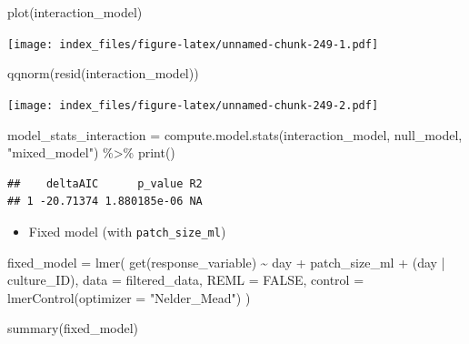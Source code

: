 \documentclass[
]{article}
\newenvironment{Shaded}{\begin{snugshade}}{\end{snugshade}}
\newcommand{\AttributeTok}[1]{\textcolor[rgb]{0.77,0.63,0.00}{#1}}
\newcommand{\ConstantTok}[1]{\textcolor[rgb]{0.00,0.00,0.00}{#1}}
\newcommand{\FunctionTok}[1]{\textcolor[rgb]{0.00,0.00,0.00}{#1}}
\newcommand{\NormalTok}[1]{#1}
\newcommand{\OtherTok}[1]{\textcolor[rgb]{0.56,0.35,0.01}{#1}}
\newcommand{\SpecialCharTok}[1]{\textcolor[rgb]{0.00,0.00,0.00}{#1}}
\newcommand{\StringTok}[1]{\textcolor[rgb]{0.31,0.60,0.02}{#1}}
\providecommand{\tightlist}{%
  \setlength{\itemsep}{0pt}\setlength{\parskip}{0pt}}
\begin{document}
\begin{Shaded}
\begin{Highlighting}[]
\FunctionTok{plot}\NormalTok{(interaction\_model)}
\end{Highlighting}
\end{Shaded}

\texttt{[image: index\_files/figure-latex/unnamed-chunk-249-1.pdf]}

\begin{Shaded}
\begin{Highlighting}[]
\FunctionTok{qqnorm}\NormalTok{(}\FunctionTok{resid}\NormalTok{(interaction\_model))}
\end{Highlighting}
\end{Shaded}

\texttt{[image: index\_files/figure-latex/unnamed-chunk-249-2.pdf]}

\begin{Shaded}
\begin{Highlighting}[]
\NormalTok{model\_stats\_interaction }\OtherTok{=} \FunctionTok{compute.model.stats}\NormalTok{(interaction\_model,}
\NormalTok{                                              null\_model,}
                                              \StringTok{"mixed\_model"}\NormalTok{) }\SpecialCharTok{\%\textgreater{}\%}
  \FunctionTok{print}\NormalTok{()}
\end{Highlighting}
\end{Shaded}

\begin{verbatim}
##    deltaAIC      p_value R2
## 1 -20.71374 1.880185e-06 NA
\end{verbatim}

\begin{itemize}
\tightlist
\item
  Fixed model (with \texttt{patch\_size\_ml})
\end{itemize}

\begin{Shaded}
\begin{Highlighting}[]
\NormalTok{fixed\_model }\OtherTok{=} \FunctionTok{lmer}\NormalTok{(}
  \FunctionTok{get}\NormalTok{(response\_variable) }\SpecialCharTok{\textasciitilde{}}
\NormalTok{    day }\SpecialCharTok{+}
\NormalTok{    patch\_size\_ml }\SpecialCharTok{+}
\NormalTok{    (day }\SpecialCharTok{|}\NormalTok{ culture\_ID),}
  \AttributeTok{data =}\NormalTok{ filtered\_data,}
  \AttributeTok{REML =} \ConstantTok{FALSE}\NormalTok{,}
  \AttributeTok{control =} \FunctionTok{lmerControl}\NormalTok{(}\AttributeTok{optimizer =} \StringTok{"Nelder\_Mead"}\NormalTok{)}
\NormalTok{)}

\FunctionTok{summary}\NormalTok{(fixed\_model)}
\end{Highlighting}
\end{Shaded}
\end{document}
